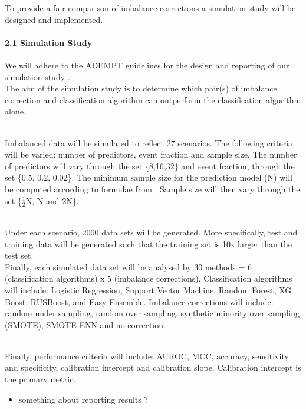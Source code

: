 \documentclass[
  11pt,
]{article}
\providecommand{\tightlist}{%
  \setlength{\itemsep}{0pt}\setlength{\parskip}{0pt}}
\begin{document}
To provide a fair comparison of imbalance corrections a simulation study
will be designed and implemented.

\hypertarget{simulation-study}{%
\paragraph{2.1\textbar{} Simulation Study~}\label{simulation-study}}

\hfill\break
\hfill\break
We will adhere to the ADEMPT guidelines for the design and reporting of
our simulation study \autocite{tim_morris}.\\
The aim of the simulation study is to determine which pair(s) of
imbalance correction and classification algorithm can outperform the
classification algorithm alone.\\
\strut \\
Imbalanced data will be simulated to reflect 27 scenarios. The following
criteria will be varied: number of predictors, event fraction and sample
size. The number of predictors will vary through the set \{8,16,32\} and
event fraction, through the set \{0.5, 0.2, 0.02\}. The minimum sample
size for the prediction model (N) will be computed according to formulae
from \textcite{riley}. Sample size will then vary through the set
\{\(\frac{1}{2}\)N, N and 2N\}.\\
\strut \\
Under each scenario, 2000 data sets will be generated. More
specifically, test and training data will be generated such that the
training set is 10x larger than the test set.\\
Finally, each simulated data set will be analysed by 30 methods = 6
(classification algorithms) x 5 (imbalance corrections). Classification
algorithms will include: Logistic Regression, Support Vector Machine,
Random Forest, XG Boost, RUSBoost, and Easy Ensemble. Imbalance
corrections will include: random under sampling, random over sampling,
synthetic minority over sampling (SMOTE), SMOTE-ENN and no correction.\\
\strut \\
Finally, performance criteria will include: AUROC, MCC, accuracy,
sensitivity and specificity, calibration intercept and calibration
slope. Calibration intercept is the primary metric.\\

\begin{itemize}
\tightlist
\item
  something about reporting results ?
\end{itemize}
\end{document}
